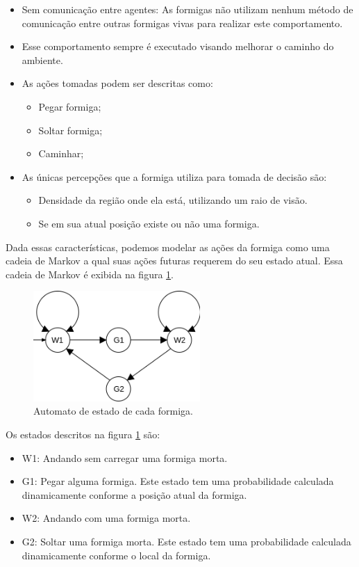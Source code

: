 \documentclass[conference]{IEEEtran}
\begin{document}
\begin{itemize}
    \item Sem comunicação entre agentes: As formigas não utilizam nenhum método de comunicação entre outras formigas vivas para realizar este comportamento.
    \item Esse comportamento sempre é executado visando melhorar o caminho do ambiente.
    \item As ações tomadas podem ser descritas como:
    \begin{itemize}
        \item Pegar formiga;
        \item Soltar formiga;
        \item Caminhar;
    \end{itemize}
    \item As únicas percepções que a formiga utiliza para tomada de decisão são:
    \begin{itemize}
        \item Densidade da região onde ela está, utilizando um raio de visão.
        \item Se em sua atual posição existe ou não uma formiga.
    \end{itemize}
\end{itemize}

Dada essas características, podemos modelar as ações da formiga como uma cadeia de Markov a qual suas ações futuras requerem do seu estado atual. Essa cadeia de Markov é exibida na figura \ref{fig:automata}.

\begin{figure}[ht]
\centering
\includegraphics[width=2.5in]{how_walk_1.png}
\caption{Automato de estado de cada formiga.}
\label{fig:automata}
\end{figure}

Os estados descritos na figura \ref{fig:automata} são:

\begin{itemize}
    \item W1: Andando sem carregar uma formiga morta.
    \item G1: Pegar alguma formiga. Este estado tem uma probabilidade calculada dinamicamente conforme a posição atual da formiga.
    \item W2: Andando com uma formiga morta.
    \item G2: Soltar uma formiga morta. Este estado tem uma probabilidade calculada dinamicamente conforme o local da formiga.
\end{itemize}
\end{document}
